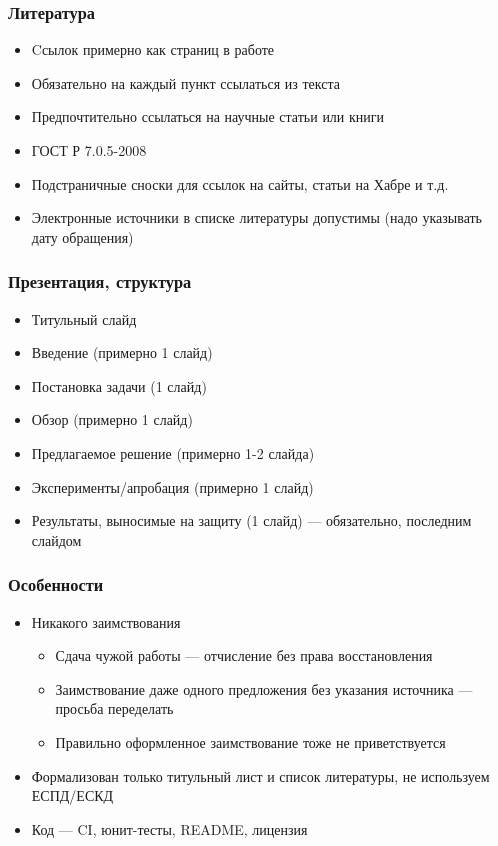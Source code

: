 \documentclass[xetex,mathserif,serif]{beamer}
\begin{document}
    \begin{frame}
        \frametitle{Литература}
        \begin{itemize}
            \item Cсылок примерно как страниц в работе
            \item Обязательно на каждый пункт ссылаться из текста
            \item Предпочтительно ссылаться на научные статьи или книги
            \item ГОСТ Р 7.0.5-2008
            \item Подстраничные сноски для ссылок на сайты, статьи на Хабре и т.д.
            \item Электронные источники в списке литературы допустимы (надо указывать дату обращения)
        \end{itemize}
    \end{frame}

    \begin{frame}
        \frametitle{Презентация, структура}
        \begin{itemize}
            \item Титульный слайд
            \item Введение (примерно 1 слайд)
            \item Постановка задачи (1 слайд)
            \item Обзор (примерно 1 слайд)
            \item Предлагаемое решение (примерно 1-2 слайда)
            \item Эксперименты/апробация (примерно 1 слайд)
            \item Результаты, выносимые на защиту (1 слайд) --- обязательно, последним слайдом
        \end{itemize}
    \end{frame}

    \begin{frame}
        \frametitle{Особенности}
        \begin{itemize}
            \item Никакого заимствования 
            \begin{itemize}
                \item Сдача чужой работы --- отчисление без права восстановления
                \item Заимствование даже одного предложения без указания источника --- просьба переделать
                \item Правильно оформленное заимствование тоже не приветствуется
            \end{itemize}
            \item Формализован только титульный лист и список литературы, не используем ЕСПД/ЕСКД
            \item Код --- CI, юнит-тесты, README, лицензия
        \end{itemize}
    \end{frame}
\end{document}
